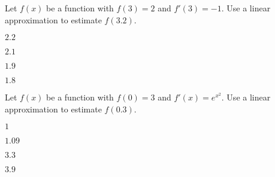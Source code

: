 \begin{readinessAssuranceTest}
\item Let \(f(x)\) be a function with \(f(3)=2\) and \(f'(3)=-1\).  Use a linear approximation to estimate \(f(3.2)\). 
\begin{multicols}{4}
\begin{readinessAssuranceTestChoices}
\item \(2.2\)
\item \(2.1\)
\item \(1.9\)
\item \(1.8\) %
\end{readinessAssuranceTestChoices}
\end{multicols}

\item Let \(f(x)\) be a function with \(f(0)=3\) and \(f'(x)=e^{x^2}\).  Use a linear approximation to estimate \(f(0.3)\). 
\begin{multicols}{4}
\begin{readinessAssuranceTestChoices}
\item \(1\)
\item \(1.09\)
\item \(3.3\) %
\item \(3.9\) 
\end{readinessAssuranceTestChoices}
\end{multicols}

\end{readinessAssuranceTest}
